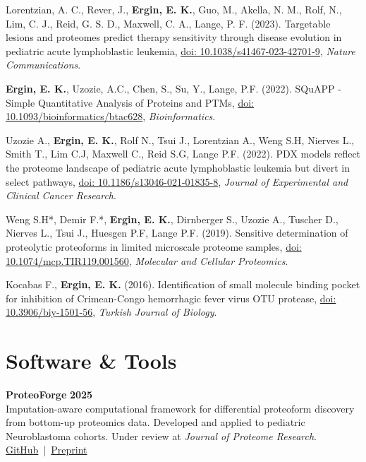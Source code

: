 \documentclass[margin,line]{res}
\begin{document}
\begin{resume}
Lorentzian, A. C., Rever, J., {\bf Ergin, E. K.}, Guo, M., Akella, N. M., Rolf, N., Lim, C. J., Reid, G. S. D., Maxwell, C. A., Lange, P. F. (2023). Targetable lesions and proteomes predict therapy sensitivity through disease evolution in pediatric acute lymphoblastic leukemia, \href{https://doi.org/10.1038/s41467-023-42701-9}{doi: 10.1038/s41467-023-42701-9}, {\em Nature Communications}.

{\bf Ergin, E. K.}, Uzozie, A.C., Chen, S., Su, Y., Lange, P.F. (2022). SQuAPP - Simple Quantitative Analysis of Proteins and PTMs, \href{https://doi.org/10.1093/bioinformatics/btac628}{doi: 10.1093/bioinformatics/btac628}, {\em Bioinformatics}.

Uzozie A., {\bf Ergin, E. K.}, Rolf N., Tsui J., Lorentzian A., Weng S.H,  Nierves L., Smith T., Lim C.J,  Maxwell C., Reid S.G, Lange P.F. (2022). PDX models reflect the proteome landscape of pediatric acute lymphoblastic leukemia but divert in select pathways, \href{https://dx.doi.org/10.1186%2Fs13046-021-01835-8}{doi: 10.1186/s13046-021-01835-8}, {\em Journal of Experimental and Clinical Cancer Research}.

Weng S.H*, Demir F.*, {\bf Ergin, E. K.}, Dirnberger S., Uzozie A., Tuscher D., Nierves L., Tsui J., Huesgen P.F, Lange P.F. (2019). Sensitive determination of proteolytic proteoforms in limited microscale proteome samples, \href{https://doi.org/10.1074/mcp.TIR119.001560}{doi: 10.1074/mcp.TIR119.001560}, {\em Molecular and Cellular Proteomics}.

Kocabas F., {\bf Ergin, E. K.} (2016). Identification of small molecule binding pocket for inhibition of Crimean-Congo hemorrhagic fever virus OTU protease, \href{https://www.researchgate.net/profile/Fatih_Kocabas/publication/284188739_Identification_of_small_molecule_binding_pocket_for_inhibition_of_Crimean-Congo_hemorrhagic_fever_virus_OTU_protease/links/564f6a0b08aefe619b11de98.pdf}{doi: 10.3906/biy-1501-56}, {\em Turkish Journal of Biology}.


\section{\sc Software \& Tools}

{\bf ProteoForge} \hfill {\bf 2025}\\
Imputation-aware computational framework for differential proteoform discovery from bottom-up proteomics data. Developed and applied to pediatric Neuroblastoma cohorts. Under review at {\em Journal of Proteome Research}.\\
{\small \href{https://github.com/LangeLab/ProteoForge_Analysis}{GitHub}~|~\href{https://www.biorxiv.org/content/10.64898/2025.12.12.694008}{Preprint}}


\end{resume}
\end{document}
